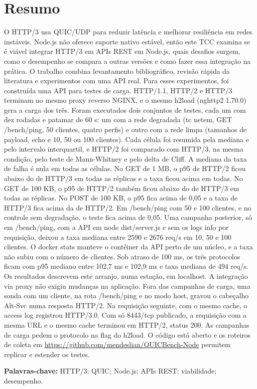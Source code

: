 \chapter*{Resumo}

O HTTP/3 usa QUIC/UDP para reduzir latência e melhorar resiliência em redes instáveis. Node.js não oferece suporte nativo estável, então este TCC examina se é viável integrar HTTP/3 em APIs REST em Node.js, quais desafios surgem, como o desempenho se compara a outras versões e como fazer essa integração na prática. O trabalho combina levantamento bibliográfico, revisão rápida da literatura e experimentos com uma API real. Para esses experimentos, foi construída uma API para testes de carga. HTTP/1.1, HTTP/2 e HTTP/3 terminam no mesmo proxy reverso NGINX, e o mesmo h2load (nghttp2 1.70.0) gera a carga dos três. Foram executados dois conjuntos de testes, cada um com dez rodadas e patamar de 60 s: um com a rede degradada (tc netem, GET /bench/ping, 50 clientes, quatro perfis) e outro com a rede limpa (tamanhos de payload, echo e 10, 50 ou 100 clientes). Cada célula foi resumida pela mediana e pelo intervalo interquartil, e HTTP/2 foi comparado com HTTP/3, na mesma condição, pelo teste de Mann-Whitney e pelo delta de Cliff. A mediana da taxa de falha é nula em todas as células. No GET de 1 MB, o p95 de HTTP/2 ficou abaixo do de HTTP/3 em todas as réplicas e a taxa ficou acima em todas. No GET de 100 KB, o p95 de HTTP/2 também ficou abaixo do de HTTP/3 em todas as réplicas. No POST de 100 KB, o p95 fica acima de 0,05 e a taxa de HTTP/3 fica acima da de HTTP/2. Em /bench/ping com 50 e 100 clientes, e no controle sem degradação, o teste fica acima de 0,05. Uma campanha posterior, só em /bench/ping, com a API em node dist/server.js e sem os logs info por requisição, deixou a taxa mediana entre 2590 e 2676 req/s em 10, 50 e 100 clientes. O docker stats manteve o contêiner da API perto de um núcleo, e a taxa não subiu com o número de clientes. Sob atraso de 100 ms, os três protocolos ficam com p95 mediano entre 102,7 ms e 102,9 ms e taxa mediana de 494 req/s. Os resultados descrevem este arranjo, numa estação, em localhost. A integração via proxy não exigiu mudanças na aplicação. Fora das campanhas de carga, uma sonda com um cliente, na rota /bench/ping e no modo host, gravou o cabeçalho Alt-Svc numa resposta HTTP/2. Na requisição seguinte, com o mesmo cache, o access log registrou HTTP/3.0. Com só 8443/tcp publicado, a requisição com a mesma URL e o mesmo cache terminou em HTTP/2, status 200. As campanhas de carga pedem o protocolo na flag do h2load. O código está aberto e os roteiros de coleta em \url{https://github.com/mendeslian/QUICBench-Node} permitem replicar e estender os testes.

\noindent\textbf{Palavras-chave:} HTTP/3; QUIC; Node.js; APIs REST; viabilidade; desempenho.
